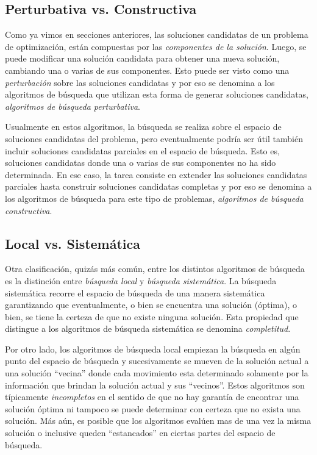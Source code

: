 \subsection{Perturbativa vs. Constructiva}

Como ya vimos en secciones anteriores, las soluciones candidatas de un problema
de optimizaci\'on, est\'an compuestas por las \textit{componentes de la
soluci\'on}. Luego, se puede modificar una soluci\'on candidata para obtener
una nueva soluci\'on, cambiando una o varias de sus componentes. Esto puede ser
visto como una \textit{perturbaci\'on} sobre las soluciones candidatas y por eso
se denomina a los algoritmos de b\'usqueda que utilizan esta forma de generar
soluciones candidatas, \textit{algoritmos de b\'usqueda perturbativa}.

Usualmente en estos algoritmos, la b\'usqueda se realiza sobre el espacio de
soluciones candidatas del problema, pero eventualmente podr\'ia ser \'util
tambi\'en incluir soluciones candidatas parciales en el espacio de b\'usqueda.
Esto es, soluciones candidatas donde una o varias de sus componentes no ha sido
determinada. En ese caso, la tarea consiste en extender las soluciones
candidatas parciales hasta construir soluciones candidatas completas y por eso
se denomina a los algoritmos de b\'usqueda para este tipo de problemas,
\textit{algoritmos de b\'usqueda constructiva}.

\subsection{Local vs. Sistem\'atica}

Otra clasificaci\'on, quiz\'as m\'as com\'un, entre los distintos algoritmos de
b\'usqueda es la distinci\'on entre \textit{b\'usqueda local} y
\textit{b\'usqueda sistem\'atica}. La b\'usqueda sistem\'atica recorre el
espacio de b\'usqueda de una manera sistem\'atica garantizando que
eventualmente, o bien se encuentra una soluci\'on (\'optima), o bien, se tiene
la certeza de que no existe ninguna soluci\'on. Esta propiedad que distingue a
los algoritmos de b\'usqueda sistem\'atica se denomina \textit{completitud}.

Por otro lado, los algoritmos de b\'usqueda local empiezan la b\'usqueda en
alg\'un punto del espacio de b\'usqueda y sucesivamente se mueven de la
soluci\'on actual a una soluci\'on ``vecina'' donde cada movimiento esta
determinado solamente por la informaci\'on que brindan la soluci\'on actual y
sus ``vecinos''. Estos algoritmos son t\'ipicamente \textit{incompletos} en el
sentido de que no hay garant\'ia de encontrar una soluci\'on \'optima ni tampoco
se puede determinar con certeza que no exista una soluci\'on. M\'as a\'un, es
posible que los algoritmos eval\'uen mas de una vez la misma soluci\'on o
inclusive queden ``estancados'' en ciertas partes del espacio de b\'usqueda.

